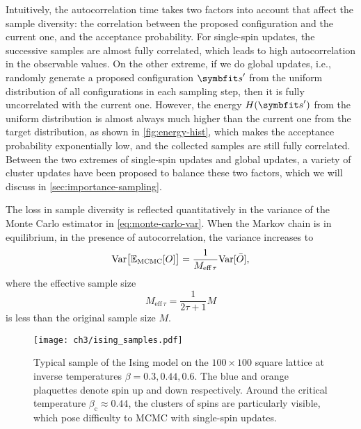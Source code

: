 Intuitively, the autocorrelation time takes two factors into account that affect the sample diversity: the correlation between the proposed configuration and the current one, and the acceptance probability. For single-spin updates, the successive samples are almost fully correlated, which leads to high autocorrelation in the observable values. On the other extreme, if we do global updates, i.e., randomly generate a proposed configuration $\vs'$ from the uniform distribution of all configurations in each sampling step, then it is fully uncorrelated with the current one. However, the energy $H(\vs')$ from the uniform distribution is almost always much higher than the current one from the target distribution, as shown in \cref{fig:energy-hist}, which makes the acceptance probability exponentially low, and the collected samples are still fully correlated. Between the two extremes of single-spin updates and global updates, a variety of cluster updates have been proposed to balance these two factors, which we will discuss in \cref{sec:importance-sampling}.

The loss in sample diversity is reflected quantitatively in the variance of the Monte Carlo estimator in \cref{eq:monte-carlo-var}. When the Markov chain is in equilibrium, in the presence of autocorrelation, the variance increases to
\begin{equation}
\mathrm{Var}\big[ \mathbb{E}_\text{MCMC}[O] \big] = \frac{1}{M_{\text{eff}\,\tau}} \mathrm{Var}[\bar{O}],
\end{equation}
where the effective sample size
\begin{equation}
M_{\text{eff}\,\tau} = \frac{1}{2 \tau + 1} M
\end{equation}
is less than the original sample size $M$.

\begin{figure}[htb]
\centering
\texttt{[image: ch3/ising\_samples.pdf]}
\caption[Sample of Ising model at different temperatures]{
Typical sample of the Ising model on the $100 \times 100$ square lattice at inverse temperatures $\beta = 0.3, 0.44, 0.6$. The blue and orange plaquettes denote spin up and down respectively. Around the critical temperature $\beta_\text{c} \approx 0.44$, the clusters of spins are particularly visible, which pose difficulty to MCMC with single-spin updates.
}
\label{fig:ising-samples}
\end{figure}

